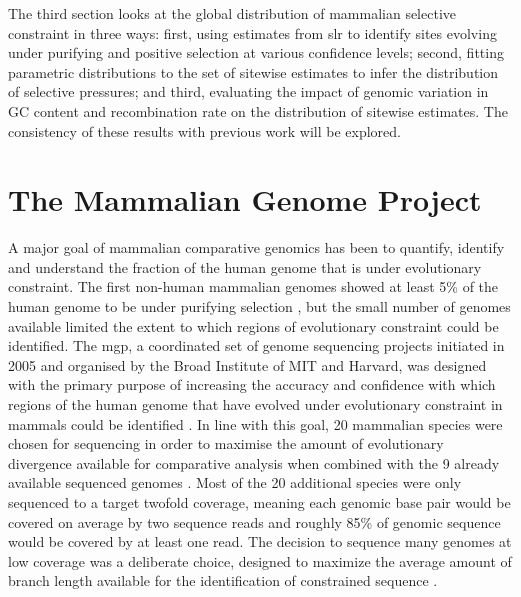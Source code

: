 The third section looks at the global distribution of mammalian
selective constraint in three ways: first, using \sw estimates from
\ac{slr} to identify sites evolving under purifying and positive
selection at various confidence levels; second, fitting parametric
distributions to the set of sitewise estimates to infer the
distribution of selective pressures; and third, evaluating the impact
of genomic variation in GC content and recombination rate on the
distribution of sitewise estimates. The consistency of these results
with previous work will be explored.

\section{The Mammalian Genome Project}

A major goal of mammalian comparative genomics has been to quantify,
identify and understand the fraction of the human genome that is under
evolutionary constraint. The first non-human mammalian genomes showed
at least 5\% of the human genome to be under purifying selection
\citep{Mouse2002Initial,Rat2004Genome,LindbladToh2005Genome}, but the
small number of genomes available limited the extent to which regions
of evolutionary constraint could be identified. The \ac{mgp}, a
coordinated set of genome sequencing projects initiated in 2005 and
organised by the Broad Institute of MIT and Harvard, was designed with
the primary purpose of increasing the accuracy and confidence with
which regions of the human genome that have evolved under evolutionary
constraint in mammals could be identified \citep{Margulies2007}. In
line with this goal, 20 mammalian species were chosen for sequencing
in order to maximise the amount of evolutionary divergence available
for comparative analysis when combined with the 9 already available
sequenced genomes \citep{Margulies2005Initial}. Most of the 20
additional species were only sequenced to a target twofold coverage,
meaning each genomic base pair would be covered on average by two
sequence reads and roughly 85\% of genomic sequence would be covered
by at least one read. The decision to sequence many genomes at low
coverage was a deliberate choice, designed to maximize the average
amount of branch length available for the identification of
constrained sequence \citep{Margulies2007}.


